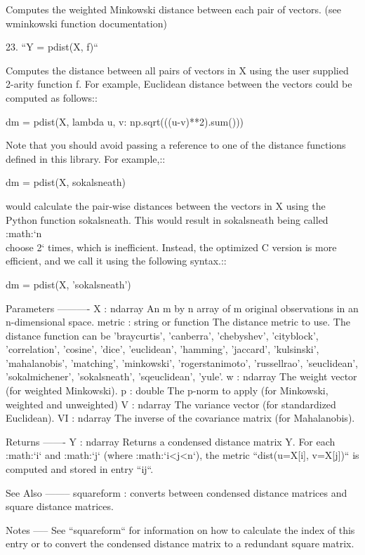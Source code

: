 \begin{DoxyVerb}
   Computes the weighted Minkowski distance between each pair of
   vectors. (see wminkowski function documentation)

23. ``Y = pdist(X, f)``

   Computes the distance between all pairs of vectors in X
   using the user supplied 2-arity function f. For example,
   Euclidean distance between the vectors could be computed
   as follows::

     dm = pdist(X, lambda u, v: np.sqrt(((u-v)**2).sum()))

   Note that you should avoid passing a reference to one of
   the distance functions defined in this library. For example,::

     dm = pdist(X, sokalsneath)

   would calculate the pair-wise distances between the vectors in
   X using the Python function sokalsneath. This would result in
   sokalsneath being called :math:`{n \\choose 2}` times, which
   is inefficient. Instead, the optimized C version is more
   efficient, and we call it using the following syntax.::

     dm = pdist(X, 'sokalsneath')

Parameters
----------
X : ndarray
    An m by n array of m original observations in an
    n-dimensional space.
metric : string or function
    The distance metric to use. The distance function can
    be 'braycurtis', 'canberra', 'chebyshev', 'cityblock',
    'correlation', 'cosine', 'dice', 'euclidean', 'hamming',
    'jaccard', 'kulsinski', 'mahalanobis', 'matching',
    'minkowski', 'rogerstanimoto', 'russellrao', 'seuclidean',
    'sokalmichener', 'sokalsneath', 'sqeuclidean', 'yule'.
w : ndarray
    The weight vector (for weighted Minkowski).
p : double
    The p-norm to apply (for Minkowski, weighted and unweighted)
V : ndarray
        The variance vector (for standardized Euclidean).
VI : ndarray
    The inverse of the covariance matrix (for Mahalanobis).

Returns
-------
Y : ndarray
    Returns a condensed distance matrix Y.  For
    each :math:`i` and :math:`j` (where :math:`i<j<n`), the
    metric ``dist(u=X[i], v=X[j])`` is computed and stored in entry ``ij``.

See Also
--------
squareform : converts between condensed distance matrices and
             square distance matrices.

Notes
-----
See ``squareform`` for information on how to calculate the index of
this entry or to convert the condensed distance matrix to a
redundant square matrix.\end{DoxyVerb}
 \hypertarget{namespacescipy_1_1spatial_1_1distance_ace78ac9a6feba0a188ce3f99bd6062fc}{}
